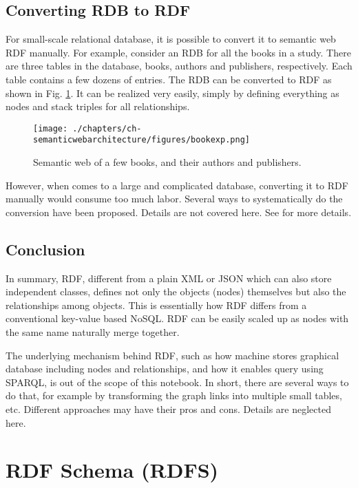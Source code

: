 \subsection{Converting RDB to RDF}

For small-scale relational database, it is possible to convert it to semantic web RDF manually. For example, consider an RDB for all the books in a study. There are three tables in the database, books, authors and publishers, respectively. Each table contains a few dozens of entries. The RDB can be converted to RDF as shown in Fig. \ref{fig:bookexp}. It can be realized very easily, simply by defining everything as nodes and stack triples for all relationships.
\begin{figure}[htbp]
	\centering
	\texttt{[image: ./chapters/ch-semanticwebarchitecture/figures/bookexp.png]}
	\caption{Semantic web of a few books, and their authors and publishers.}
	\label{fig:bookexp}
\end{figure}

However, when comes to a large and complicated database, converting it to RDF manually would consume too much labor. Several ways to systematically do the conversion have been proposed. Details are not covered here. See \cite{michel2014survey} for more details.

\subsection{Conclusion}

In summary, RDF, different from a plain XML or JSON which can also store independent classes, defines not only the objects (nodes) themselves but also the relationships among objects. This is essentially how RDF differs from a conventional key-value based NoSQL. RDF can be easily scaled up as nodes with the same name naturally merge together.

The underlying mechanism behind RDF, such as how machine stores graphical database including nodes and relationships, and how it enables query using SPARQL, is out of the scope of this notebook. In short, there are several ways to do that, for example by transforming the graph links into multiple small tables, etc. Different approaches may have their pros and cons. Details are neglected here.

\section{RDF Schema (RDFS)}

